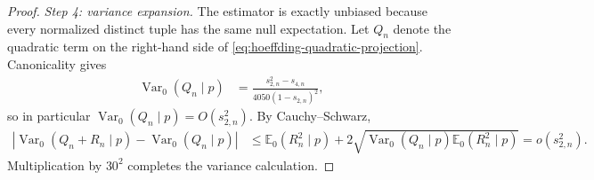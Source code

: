 \begin{proof}
\medskip\noindent
\emph{Step 4: variance expansion.}
The estimator is exactly unbiased because every normalized distinct tuple has
the same null expectation. Let $Q_n$ denote the quadratic term on the
right-hand side of \eqref{eq:hoeffding-quadratic-projection}. Canonicality
gives
\begin{align*}
  \operatorname{Var}_0(Q_n\mid p)
  &=\frac{s_{2,n}^2-s_{4,n}}
          {4050(1-s_{2,n})^2},
\end{align*}
so in particular $\operatorname{Var}_0(Q_n\mid p)=O(s_{2,n}^2)$. By
Cauchy--Schwarz,
\begin{align*}
  \left|
    \operatorname{Var}_0(Q_n+R_n\mid p)
    -\operatorname{Var}_0(Q_n\mid p)
  \right|
  &\leq
  \mathbb{E}_0(R_n^2\mid p)
  +2\sqrt{
    \operatorname{Var}_0(Q_n\mid p)
    \mathbb{E}_0(R_n^2\mid p)
  }
  =o(s_{2,n}^2).
\end{align*}
Multiplication by $30^2$ completes the variance calculation.
\end{proof}
